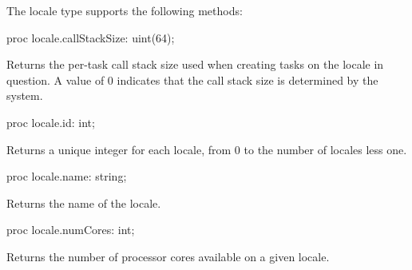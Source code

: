 The locale type supports the following methods:


\begin{protohead}
proc locale.callStackSize: uint(64);
\end{protohead}
\begin{protobody}
Returns the per-task call stack size used when creating tasks on the
locale in question.  A value of 0 indicates that the call stack size
is determined by the system.
\end{protobody}

\begin{protohead}
proc locale.id: int;
\end{protohead}
\begin{protobody}
Returns a unique integer for each locale, from 0 to the number of
locales less one.
\end{protobody}


\begin{protohead}
proc locale.name: string;
\end{protohead}
\begin{protobody}
Returns the name of the locale.
\end{protobody}

\begin{protohead}
proc locale.numCores: int;
\end{protohead}
\begin{protobody}
Returns the number of processor cores available on a given locale.
\end{protobody}

